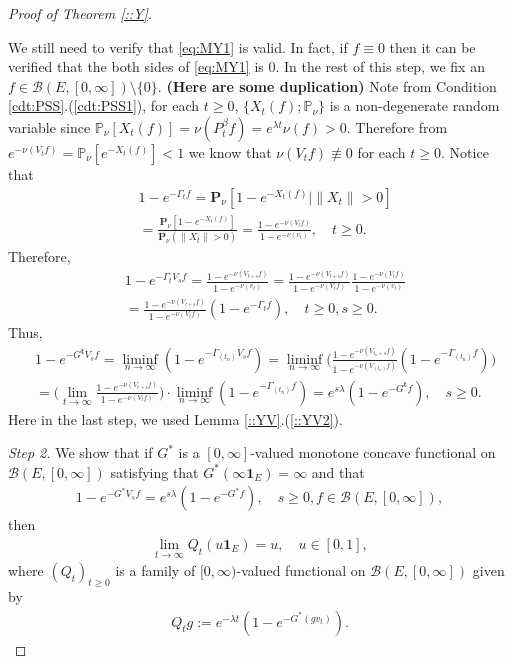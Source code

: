 \documentclass[12pt,a4paper]{amsart}
\numberwithin{equation}{section}
\theoremstyle{plain}
\theoremstyle{definition}
\theoremstyle{remark}
\newenvironment{proof*}[1][\proofname]{
  \renewcommand\qedsymbol{$\blacksquare$}
  \begin{proof}[#1]}{\end{proof}}
\begin{document}
\begin{proof}[Proof of Theorem \ref{::Y}]
\begin{proof*}
  We still need to verify that \eqref{eq:MY1} is valid.
  In fact, if $f\equiv 0$ then it can be verified that the both sides of \eqref{eq:MY1} is $0$.
  In the rest of this step, we fix an $f\in \mathcal B(E,[0,\infty])\setminus \{0\}$.
  {\bf (Here are some duplication)} Note from Condition \ref{cdt:PSS}.(\ref{cdt:PSS1}), for each $t\geq 0$, $\{X_t(f);\mathbb P_\nu\}$ is a non-degenerate random variable since $\mathbb P_\nu[X_t(f)] = \nu(P_t^\beta f) = e^{\lambda t}\nu(f)>0$. 
  Therefore from $e^{-\nu(V_tf)} = \mathbb P_\nu[e^{-X_t(f)}] < 1$ we know that $\nu(V_tf) \not\equiv 0$ for each $t\geq 0$.  
  Notice that
  \begin{align}
    \label{eq:MY2}
    & 1 - e^{- \Gamma_t f} 
    = \mathbf P_\nu [ 1 - e^{-X_t(f)} | \|X_t\|> 0] \\
    & = \frac{ \mathbf P_\nu [ 1 - e^{- X_t(f)}]}{ \mathbf P_\nu (\|X_t\| > 0)}
    = \frac{ 1 - e^{- \nu(V_tf)} }{ 1 - e^{- \nu(v_t)}},
    \quad t \geq 0.
  \end{align}
  Therefore,
  \begin{align}
    & 1 - e^{- \Gamma_t V_s f}
      = \frac{ 1 - e^{- \nu(V_{t+s} f)} }{ 1 - e^{- \nu(v_t)}}
     = \frac{ 1 - e^{- \nu(V_{t+s} f)} }{ 1 - e^{- \nu(V_tf)}} \frac{ 1 - e^{ - \nu(V_tf)}}{ 1 - e^{- \nu(v_t)}} \\
    & = \frac{ 1 - e^{- \nu(V_{t+s} f)} }{ 1 - e^{- \nu(V_tf)}} ( 1 - e^{- \Gamma_t f})
      , \quad t\geq 0, s \geq 0.
  \end{align}
  Thus,
  \begin{align}
    & 1 - e^{- G^{\mathbf t} V_s f}
      = \liminf_{n\to \infty} ( 1 - e^{- \Gamma_{(t_n)} V_s f})
      = \liminf_{n\to \infty} \Big(  \frac{ 1 - e^{- \nu(V_{t_n+s}f)}}{ 1 - e^{- \nu(V_{(t_n)}f)}} (1 - e^{- \Gamma_{(t_n)} f}) \Big) \\
    & = \Big( \lim_{t \to \infty}   \frac{ 1 - e^{- \nu(V_{t+s}f)}}{ 1 - e^{- \nu(V_{t}f)}} \Big) \cdot \liminf_{n\to \infty} (1 - e^{- \Gamma_{(t_n)} f} ) 
      = e^{s\lambda} (1 - e^{- G^{\mathbf t}f}), \quad s\geq 0.
  \end{align}
  Here in the last step, we used Lemma \ref{::YV}.(\ref{::YV2}).
\end{proof*}

  \emph{Step 2.}
  We show that if $G^*$ is a $[0,\infty]$-valued monotone concave functional on $\mathcal B(E,[0,\infty])$ satisfying that $G^*(\infty \mathbf 1_E) = \infty$ and that 
  \begin{align}
    1 - e^{- G^* V_sf} = e^{s\lambda} (1- e^{- G^* f}),
    \quad s \geq 0, f \in \mathcal B(E, [0,\infty]),
  \end{align}
  then
  \begin{align}
    \lim_{t\to \infty} Q_t(u \mathbf 1_E) 
    = u,
    \quad u \in [0,1],
  \end{align}
  where $(Q_t)_{t\geq 0}$ is a family of $[0,\infty)$-valued functional on $\mathcal B(E,[0,\infty])$ given by
  \begin{align}
    Q_tg 
    := e^{- \lambda t}( 1 - e^{-G^*(gv_t)} ).
  \end{align}


\end{proof}
\end{document}
